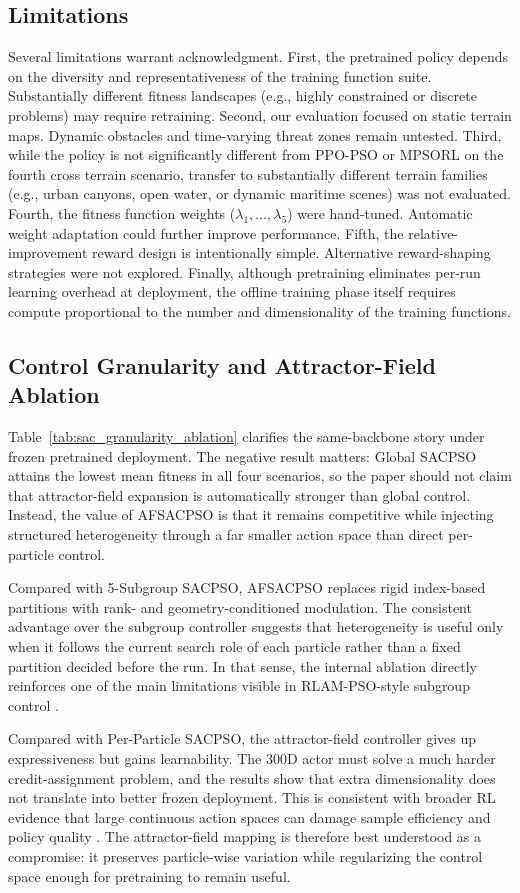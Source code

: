 \documentclass[final,5p,times]{elsarticle}
\begin{document}
\subsection{Limitations}
Several limitations warrant acknowledgment.
First, the pretrained policy depends on the diversity and representativeness of the training function suite. Substantially different fitness landscapes (e.g., highly constrained or discrete problems) may require retraining.
Second, our evaluation focused on static terrain maps. Dynamic obstacles and time-varying threat zones remain untested.
Third, while the policy is not significantly different from PPO-PSO or MPSORL on the fourth cross terrain scenario, transfer to substantially different terrain families (e.g., urban canyons, open water, or dynamic maritime scenes) was not evaluated.
Fourth, the fitness function weights ($\lambda_1, \ldots, \lambda_5$) were hand-tuned. Automatic weight adaptation could further improve performance.
Fifth, the relative-improvement reward design is intentionally simple. Alternative reward-shaping strategies were not explored.
Finally, although pretraining eliminates per-run learning overhead at deployment, the offline training phase itself requires compute proportional to the number and dimensionality of the training functions.
\subsection{Control Granularity and Attractor-Field Ablation}
Table~\ref{tab:sac_granularity_ablation} clarifies the same-backbone story under frozen pretrained deployment. The negative result matters: Global SACPSO attains the lowest mean fitness in all four scenarios, so the paper should not claim that attractor-field expansion is automatically stronger than global control. Instead, the value of AFSACPSO is that it remains competitive while injecting structured heterogeneity through a far smaller action space than direct per-particle control.

Compared with 5-Subgroup SACPSO, AFSACPSO replaces rigid index-based partitions with rank- and geometry-conditioned modulation. The consistent advantage over the subgroup controller suggests that heterogeneity is useful only when it follows the current search role of each particle rather than a fixed partition decided before the run. In that sense, the internal ablation directly reinforces one of the main limitations visible in RLAM-PSO-style subgroup control \cite{Yin2023RLAMPSO}.

Compared with Per-Particle SACPSO, the attractor-field controller gives up expressiveness but gains learnability. The 300D actor must solve a much harder credit-assignment problem, and the results show that extra dimensionality does not translate into better frozen deployment. This is consistent with broader RL evidence that large continuous action spaces can damage sample efficiency and policy quality \cite{DulacArnold2015Deep, Zhou2020PLAS}. The attractor-field mapping is therefore best understood as a compromise: it preserves particle-wise variation while regularizing the control space enough for pretraining to remain useful.
\end{document}
